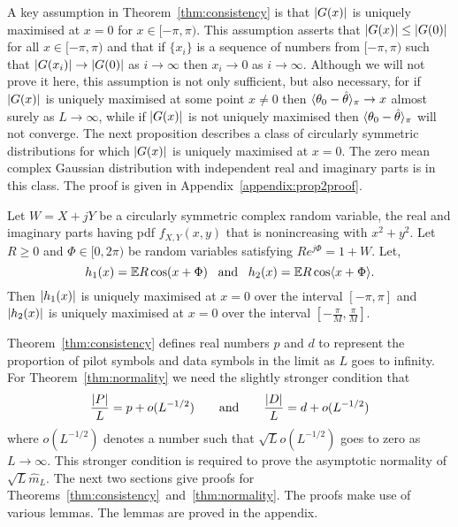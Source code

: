\documentclass[journal]{IEEEtran}
\begin{document}
A key assumption in Theorem~\ref{thm:consistency} is that ${\left\vert G(x) \right\vert}$ is uniquely maximised at $x = 0$ for $x \in [-\pi, \pi)$.  This assumption asserts that ${\left\vert G(x) \right\vert} \leq {\left\vert G(0) \right\vert}$ for all $x \in [-\pi, \pi)$ and that if $\{x_i\}$ is a sequence of numbers from $[-\pi,\pi)$ such that ${\left\vert G(x_i) \right\vert} \rightarrow {\vert G(0) \vert}$ as $i \rightarrow \infty$ then $x_i \rightarrow 0$ as $i \rightarrow \infty$.  Although we will not prove it here, this assumption is not only sufficient, but also necessary, for if ${\left\vert G(x) \right\vert}$ is uniquely maximised at some point $x \neq 0$ then $\langle \theta_0 - \hat{\theta} \rangle_\pi \rightarrow x$ almost surely as $L\rightarrow\infty$, while if ${\left\vert G(x) \right\vert}$ is not uniquely maximised then $\langle \theta_0 - \hat{\theta} \rangle_\pi$ will not converge.  The next proposition describes a class of circularly symmetric distributions for which ${\left\vert G(x) \right\vert}$ is uniquely maximised at $x = 0$.  The zero mean complex Gaussian distribution with independent real and imaginary parts is in this class.  The proof is given in Appendix~\ref{appendix:prop2proof}.

\begin{proposition}\label{prop:contgg2}
Let $W = X + jY$ be a circularly symmetric complex random variable, the real and imaginary parts having pdf $f_{X,Y}(x,y)$ that is nonincreasing with $x^2 + y^2$.  Let $R \geq 0$ and $\Phi \in [0, 2\pi)$ be random variables satisfying $R e^{j\Phi} = 1 + W$.  Let,
\[
h_1(x) = {\mathbb E} R \cos(x + \Phi) \;\;\; \text{and} \;\;\; h_2(x) =  {\mathbb E} R \cos\langle x + \Phi \rangle.
\]
Then ${\left\vert h_1(x) \right\vert}$ is uniquely maximised at $x=0$ over the interval $[-\pi,\pi]$ and ${\left\vert h_2(x) \right\vert}$ is uniquely maximised at $x = 0$ over the interval $[-\tfrac{\pi}{M},\tfrac{\pi}{M}]$.
\end{proposition}

Theorem~\ref{thm:consistency} defines real numbers $p$ and $d$ to represent the proportion of pilot symbols and data symbols in the limit as $L$ goes to infinity.  For Theorem~\ref{thm:normality} we need the slightly stronger condition that 
\[
\frac{{\left\vert P \right\vert}}{L} = p + o(L^{-1/2}) \qquad \text{and} \qquad \frac{{\left\vert D \right\vert}}{L} = d + o(L^{-1/2})
\] 
where $o(L^{-1/2})$ denotes a number such that $\sqrt{L} o(L^{-1/2})$ goes to zero as $L\rightarrow \infty$.  This stronger condition is required to prove the asymptotic normality of $\sqrt{L}\hat{m}_L$.  The next two sections give proofs for Theorems~\ref{thm:consistency}~and~\ref{thm:normality}.  The proofs make use of various lemmas.  The lemmas are proved in the appendix.
\end{document}
